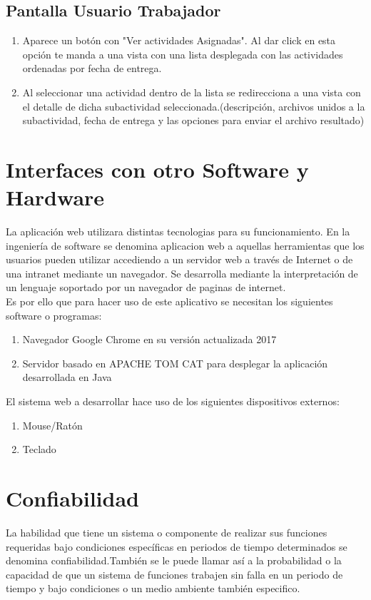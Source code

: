 \documentclass[11pt,a4paper]{article}
\begin{document}
\subsection{Pantalla Usuario Trabajador}
\begin{enumerate}
\item Aparece un botón con "Ver actividades Asignadas". Al dar click en esta opción te manda a una vista con una lista desplegada con las actividades ordenadas por fecha de entrega.
\item Al seleccionar una actividad dentro de la lista se redirecciona a una vista con el detalle de dicha subactividad seleccionada.(descripción, archivos unidos a la subactividad, fecha de entrega y las opciones para enviar el archivo resultado)

\end{enumerate}


\section{Interfaces con otro Software y Hardware}
La aplicación web utilizara distintas tecnologias para su funcionamiento. En la ingeniería de software se denomina aplicacion web a aquellas herramientas que los usuarios pueden utilizar accediendo a un servidor web a través de Internet o de una intranet mediante un navegador. Se desarrolla mediante la interpretación de un lenguaje soportado por un navegador de paginas de internet.
\\
Es por ello que para hacer uso de este aplicativo se necesitan los siguientes software o programas:
\begin{enumerate}
\item Navegador Google Chrome en su versión actualizada 2017
\item Servidor basado en APACHE TOM CAT para desplegar la aplicación desarrollada en Java
\end{enumerate}
El sistema web a desarrollar hace uso de los siguientes dispositivos externos:
\begin{enumerate}
\item Mouse/Ratón
\item Teclado 
\end{enumerate}
\section{Confiabilidad}
La habilidad que tiene un sistema o componente de realizar sus funciones requeridas bajo condiciones específicas en periodos de tiempo determinados se denomina confiabilidad.También se le puede llamar así a la probabilidad o la capacidad de que un sistema de funciones trabajen sin falla en un periodo de tiempo y bajo condiciones o un medio ambiente también especifico.
\end{document}
